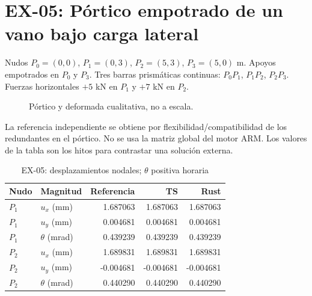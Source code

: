 \documentclass[11pt,a4paper]{article}
\newcommand{\kN}{\,\mathrm{kN}}
\newcommand{\m}{\,\mathrm{m}}
\newcommand{\caseheading}[2]{\section{#1: #2}}
\begin{document}
\caseheading{EX-05}{Pórtico empotrado de un vano bajo carga lateral}
Nudos $P_0=(0,0)$, $P_1=(0,3)$, $P_2=(5,3)$,
$P_3=(5,0)$ m. Apoyos empotrados en $P_0$ y $P_3$.
Tres barras prismáticas continuas: $P_0P_1$, $P_1P_2$, $P_2P_3$.
Fuerzas horizontales $+5$ kN en $P_1$ y $+7$ kN en $P_2$.
\begin{figure}[H]\centering
{}
\caption{Pórtico y deformada cualitativa, no a escala.}
\end{figure}
La referencia independiente se obtiene por flexibilidad/compatibilidad de
los redundantes en el pórtico. No se usa la matriz global del motor ARM.
Los valores de la tabla son los hitos para contrastar una solución externa.
\begin{table}[H]\centering
\caption{EX-05: desplazamientos nodales; $\theta$ positiva horaria}
\begin{tabular}{@{}llrrr@{}}\toprule
Nudo & Magnitud & Referencia & TS & Rust\\\midrule
$P_1$ & $u_x$ (mm) & 1.687063 & 1.687063 & 1.687063\\
$P_1$ & $u_y$ (mm) & 0.004681 & 0.004681 & 0.004681\\
$P_1$ & $\theta$ (mrad) & 0.439239 & 0.439239 & 0.439239\\
$P_2$ & $u_x$ (mm) & 1.689831 & 1.689831 & 1.689831\\
$P_2$ & $u_y$ (mm) & -0.004681 & -0.004681 & -0.004681\\
$P_2$ & $\theta$ (mrad) & 0.440290 & 0.440290 & 0.440290\\
\bottomrule\end{tabular}
\end{table}
\end{document}
